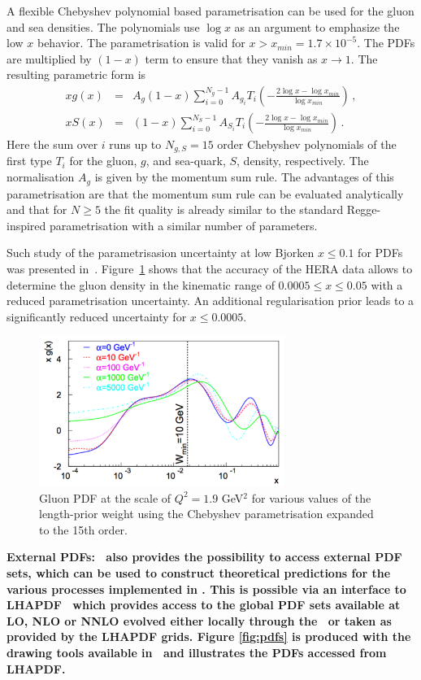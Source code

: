 \begin{description}
A flexible Chebyshev polynomial based parametrisation can be used for the gluon and sea densities. The polynomials
use $\log x$ as an argument to emphasize the low $x$ behavior. 
The parametrisation is valid for $x>x_{min} = 1.7\times 10^{-5}$. The PDFs are multiplied
by $(1-x)$ term to ensure that they vanish as $x\to 1$. The resulting parametric form is 
\begin{eqnarray}
x g(x) &=& A_g \left(1-x\right) \sum_{i=0}^{N_g-1} A_{g_i} T_i \left(-\frac{\textstyle 2\log x - \log x_{min} } {\textstyle \log x_{min} } \right)\,, \label{eq:glu} \\
x S(x) &=& \left(1-x\right) \sum_{i=0}^{N_S-1} A_{S_i} T_i \left(-\frac{\textstyle 2\log x - \log x_{min} } {\textstyle \log x_{min} } \right)\,. \label{eq:sea} 
\end{eqnarray}
Here the sum over $i$ runs up to $N_{g,S}=15$ order Chebyshev polynomials of the first type $T_i$ for
the gluon, $g$, and sea-quark, $S$, density, respectively. 
The normalisation $A_g$ is given by the momentum sum rule.
%
The advantages of this parametrisation are that the momentum sum rule can be evaluated analytically 
and that for $N \ge 5$ the fit quality is already similar
to the standard Regge-inspired parametrisation with a similar number of parameters.

Such study of the parametrisasion uncertainty at low Bjorken $x \le 0.1$ for PDFs was presented 
in~\cite{Chebyshev}. Figure~\ref{fig:cheb} shows that the accuracy of 
the HERA data allows to determine the gluon density in the kinematic range of $0.0005 \le x \le 0.05$ 
with a reduced parametrisation uncertainty. An additional regularisation prior leads to a 
significantly reduced uncertainty for $x \le 0.0005$.
\begin{figure}[!ht]
 \centering
  \includegraphics[width=8cm]{cheb.pdf}
 \caption{Gluon PDF at the scale of $Q^2=1.9$ GeV$^2$ for various values of the length-prior 
          weight using the Chebyshev parametrisation expanded to the 15th order.}
 \label{fig:cheb}
\end{figure}

%
\item \bf{External PDFs:} \rm 
\fitter\ also provides the possibility to access external PDF sets, which can be used to construct 
theoretical predictions for the various processes implemented in \fitter. This is possible via an 
interface to LHAPDF~\cite{lhapdf,lhapdfweb} which provides access to the global PDF sets available at LO, NLO 
or NNLO evolved either locally through the \fitter\ or taken as provided by the LHAPDF grids. 
Figure \ref{fig:pdfs} is produced with the drawing tools available in \fitter\ and illustrates 
the PDFs accessed from LHAPDF.
\end{description}
